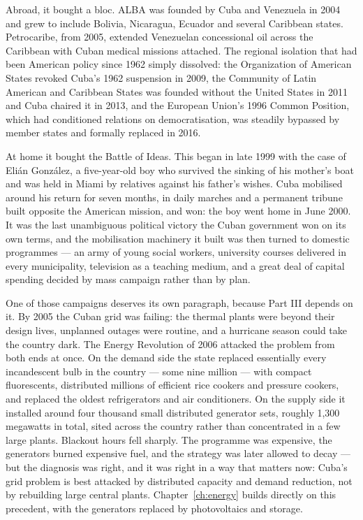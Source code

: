 Abroad, it bought a bloc. ALBA was founded by Cuba and Venezuela in 2004 and
grew to include Bolivia, Nicaragua, Ecuador and several Caribbean states.
Petrocaribe, from 2005, extended Venezuelan concessional oil across the
Caribbean with Cuban medical missions attached. The regional isolation that had
been American policy since 1962 simply dissolved: the Organization of American
States revoked Cuba's 1962 suspension in 2009, the Community of Latin American
and Caribbean States was founded without the United States in 2011 and Cuba
chaired it in 2013, and the European Union's 1996 Common Position, which had
conditioned relations on democratisation, was steadily bypassed by member states
and formally replaced in 2016.

At home it bought the Battle of Ideas. This began in late 1999 with the case of
Eli\'an Gonz\'alez, a five-year-old boy who survived the sinking of his mother's
boat and was held in Miami by relatives against his father's wishes. Cuba
mobilised around his return for seven months, in daily marches and a permanent
tribune built opposite the American mission, and won: the boy went home in June
2000. It was the last unambiguous political victory the Cuban government won on
its own terms, and the mobilisation machinery it built was then turned to
domestic programmes --- an army of young social workers, university courses
delivered in every municipality, television as a teaching medium, and a great
deal of capital spending decided by mass campaign rather than by plan.

One of those campaigns deserves its own paragraph, because Part III depends on
it. By 2005 the Cuban grid was failing: the thermal plants were beyond their
design lives, unplanned outages were routine, and a hurricane season could take
the country dark. The Energy Revolution of 2006 attacked the problem from both
ends at once. On the demand side the state replaced essentially every
incandescent bulb in the country --- some nine million --- with compact
fluorescents, distributed millions of efficient rice cookers and pressure
cookers, and replaced the oldest refrigerators and air conditioners. On the
supply side it installed around four thousand small distributed generator sets,
roughly 1,300 megawatts in total, sited across the country rather than
concentrated in a few large plants.\unv{} Blackout hours fell sharply. The
programme was expensive, the generators burned expensive fuel, and the strategy
was later allowed to decay --- but the diagnosis was right, and it was right in
a way that matters now: Cuba's grid problem is best attacked by distributed
capacity and demand reduction, not by rebuilding large central plants.
Chapter~\ref{ch:energy} builds directly on this precedent, with the generators
replaced by photovoltaics and storage.

